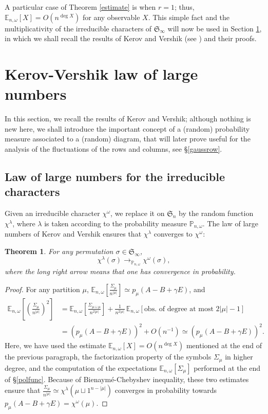 \documentclass[smallextended,nospthms]{svjour3}
\newtheorem{theorem}{Theorem}
\theoremstyle{remark}
\newcommand{\sym}{\mathfrak{S}}
\newcommand{\proba}{\mathbb{P}}
\newcommand{\esper}{\mathbb{E}}
\begin{document}
\noindent A particular case of Theorem \ref{estimate} is when $r=1$; thus, $\esper_{n,\omega}[X]=O(n^{\deg X})$ for any observable $X$. This simple fact and the multiplicativity of the irreducible characters of $\sym_{\infty}$ will now be used in Section \ref{largenumbers}, in which we shall recall the results of Kerov and Vershik (see \cite{KV81a}) and their proofs.
\bigskip





\section{Kerov-Vershik law of large numbers}\label{largenumbers}
In this section, we recall the results of Kerov and Vershik; although nothing is new here, we shall introduce the important concept of a (random) probability measure associated to a (random) diagram, that will later prove useful for the analysis of the fluctuations of the rows and columns, see \S\ref{gaussrow}.


\subsection{Law of large numbers for the irreducible characters}
Given an irreducible character $\chi^{\omega}$, we replace it on $\sym_{n}$ by the random function $\chi^{\lambda}$, where $\lambda$ is taken according to the probability measure $\proba_{n,\omega}$. The law of large numbers of Kerov and Vershik ensures that $\chi^{\lambda}$ converges to $\chi^{\omega}$:
\begin{theorem}\label{llnalg}
For any permutation $\sigma \in \sym_{\infty}$,
$$\chi^{\lambda}(\sigma) \longrightarrow_{\proba_{n,\omega}} \chi^{\omega}(\sigma),$$
where the long right arrow means that one has convergence in probability.
\end{theorem}
\begin{proof}
For any partition $\mu$, $\esper_{n,\omega}\!\left[\frac{\varSigma_{\mu}}{n^{|\mu|}}\right]\simeq p_{\mu}(A-B+\gamma E)$, and 
\begin{align*}
\esper_{n,\omega}\!\left[\left(\frac{\varSigma_{\mu}}{n^{|\mu|}}\right)^{2}\right]&=\esper_{n,\omega}\!\left[\frac{\varSigma_{\mu \sqcup \mu}}{n^{2|\mu|}}\right]+\frac{1}{n^{2|\mu|}}\,\esper_{n,\omega}[\text{obs. of degree at most }2|\mu|-1]\\
&= \left(p_{\mu}(A-B+\gamma E)\right)^{2}+O(n^{-1})\simeq \left(p_{\mu}(A-B+\gamma E)\right)^{2}.
\end{align*}
Here, we have used the estimate $\esper_{n,\omega}[X]=O(n^{\deg X})$ mentioned at the end of the previous paragraph, the factorization property of the symbols $\varSigma_{\mu}$ in higher degree, and the computation of the expectations $\esper_{n,\omega}[\varSigma_{\mu}]$ performed at the end of \S\ref{polfunc}. Because of Bienaym\'e-Chebyshev inequality, these two estimates ensure that $\frac{\varSigma_{\mu}}{n^{|\mu|}}\simeq \chi^{\lambda}(\mu \sqcup 1^{n-|\mu|})$ converges in probability towards $p_{\mu}(A-B+\gamma E)=\chi^{\omega}(\mu)$. 
\end{proof}
\bigskip
\end{document}
